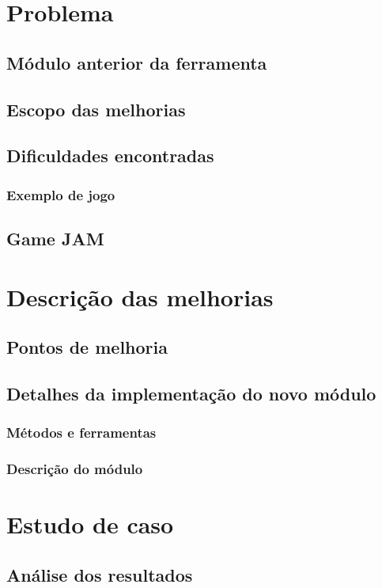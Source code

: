 \documentclass[12pt,twoside,openright,a4paper,english,brazil,sumario=tradicional]{abntex2}
\begin{document}
\chapter{Problema}
\label{chap:intro}
\section{Módulo anterior da ferramenta}
\section{Escopo das melhorias}
\section{Dificuldades encontradas}
\subsection{Exemplo de jogo}
\section{Game JAM}

\chapter{Descrição das melhorias} %
\label{chap:melhorias}
\section{Pontos de melhoria}
\section{Detalhes da implementação do novo módulo}
\subsection{Métodos e ferramentas}
\subsection{Descrição do módulo}

\chapter{Estudo de caso}
\label{chap:caso}
\section{Análise dos resultados}
\end{document}
